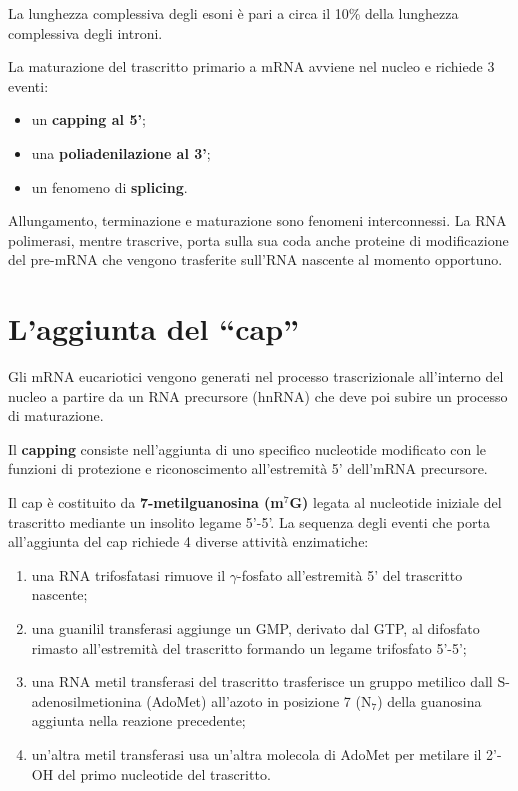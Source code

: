 \documentclass[11pt]{book}
\begin{document}
La lunghezza complessiva degli esoni è pari a circa il 10\% della
lunghezza complessiva degli introni.

La maturazione del trascritto primario a mRNA avviene nel nucleo e
richiede 3 eventi:

\begin{itemize}
\itemsep1pt\parskip0pt
\item
  un \textbf{capping al 5'};
\item
  una \textbf{poliadenilazione al 3'};
\item
  un fenomeno di \textbf{splicing}.
\end{itemize}

Allungamento, terminazione e maturazione sono fenomeni interconnessi. La
RNA polimerasi, mentre trascrive, porta sulla sua coda anche proteine di
modificazione del pre-mRNA che vengono trasferite sull'RNA nascente al
momento opportuno.

\section{\texorpdfstring{L'aggiunta del
``cap''}{L'aggiunta del cap}}\label{laggiunta-del-cap}

Gli mRNA eucariotici vengono generati nel processo trascrizionale
all'interno del nucleo a partire da un RNA precursore (hnRNA) che deve
poi subire un processo di maturazione.

Il \textbf{capping} consiste nell'aggiunta di uno specifico nucleotide
modificato con le funzioni di protezione e riconoscimento all'estremità
5' dell'mRNA precursore.

Il cap è costituito da \textbf{7-metilguanosina (m\(^7\)G)} legata al
nucleotide iniziale del trascritto mediante un insolito legame 5'-5'. La
sequenza degli eventi che porta all'aggiunta del cap richiede 4 diverse
attività enzimatiche:

\begin{enumerate}
\def\labelenumi{\arabic{enumi}.}
\itemsep1pt\parskip0pt
\item
  una RNA trifosfatasi rimuove il \(\gamma\)-fosfato all'estremità 5'
  del trascritto nascente;
\item
  una guanilil transferasi aggiunge un GMP, derivato dal GTP, al
  difosfato rimasto all'estremità del trascritto formando un legame
  trifosfato 5'-5';
\item
  una RNA metil transferasi del trascritto trasferisce un gruppo
  metilico dall S-adenosilmetionina (AdoMet) all'azoto in posizione 7
  (N\(_7\)) della guanosina aggiunta nella reazione precedente;
\item
  un'altra metil transferasi usa un'altra molecola di AdoMet per
  metilare il 2'-OH del primo nucleotide del trascritto.
\end{enumerate}
\end{document}
